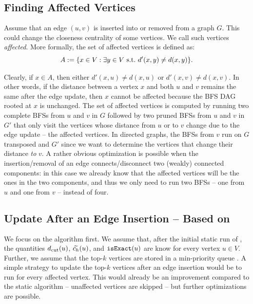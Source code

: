 \subsection{Finding Affected Vertices}
\label{sec:dyn-topk-find-affected}
%
Assume that an edge $(u, v)$ is inserted into or removed from a graph $G$.
This could change the closeness centrality of some vertices.
We call such vertices \emph{affected}.
More formally, the set of affected vertices is defined as:
%
\[
A := \set{x \in V : \exists y\in V\ \text{s.t.}\ d'(x, y) \neq d(x, y)}.
\]

Clearly, if $x\in A$, then either $d'(x, u) \neq d(x, u)$ or $d'(x, v) \neq d(x, v)$.
In other words, if the distance between a vertex $x$ and both $u$
and $v$ remains the same after the edge update, then $x$ cannot be affected
because the BFS DAG rooted at $x$ is unchanged.
The set of affected vertices is computed by running two complete BFSs from $u$
and $v$ in $G$ followed by two pruned BFSs from $u$ and $v$ in $G'$ that only
visit the vertices whose distance from $u$ or to $v$ change due to the edge
update -- \ie the affected vertices. In directed graphs, the BFSs from $v$ run
on $G$ transposed and $G'$ since we want to determine the vertices that change
their distance \emph{to} $v$.
A rather obvious optimization is possible when the insertion/removal of an edge
connects/disconnect two (weakly) connected components: in this case we already
know that the affected vertices will be the ones in the two components, and thus
we only need to run two BFSs -- one from $u$ and one from $v$ -- instead of four.


\subsection{Update After an Edge Insertion -- Based on \nbcut}
\label{sec:topk-clos-single-ins-nbcut}
%
We focus on the \nbcut algorithm first. We assume that, after the initial static
run of \nbcut, the quantities $d_{\text{cut}}(u)$, $\widetilde{c_h}(u)$, and $\texttt{isExact}(u)$
are know for every vertex $u\in V$. Further, we assume that the top-$k$ vertices
are stored in a min-priority queue \topk.
A simple strategy to update the top-$k$ vertices after an edge insertion would be
to run \bfscut for every affected vertex. This would already be an
improvement compared to the static algorithm -- unaffected vertices are skipped
-- but further optimizations are possible.



